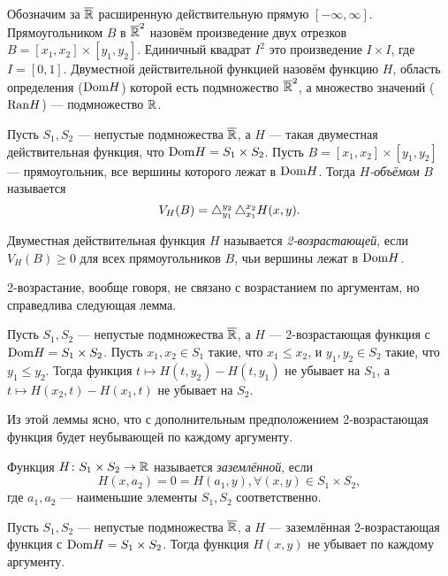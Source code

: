 Обозначим за $\overline{\mathbb{R}}$ расширенную действительную прямую $[-\infty, \infty]$. Прямоугольником $B$ в $\overline{\mathbb{R}}^2$ назовём произведение двух отрезков $B = [x_1, x_2] \times [y_1, y_2]$. Единичный квадрат $I^2$ это произведение $I \times I$, где $I = [0, 1]$. Двуместной действительной функцией назовём функцию $H$, область определения ($\mathrm{Dom}{H}$) которой есть подмножество $\overline{\mathbb{R}}^2$, а множество значений ($\mathrm{Ran}{H}$) --- подмножество $\mathbb{R}$.

\begin{define}
	Пусть $S_1, S_2$ --- непустые подмножества $\overline{\mathbb{R}}$, а $H$ --- такая двуместная действительная функция, что $\mathrm{Dom}{H} = S_1 \times S_2$. Пусть $B = [x_1, x_2] \times [y_1, y_2]$ --- прямоугольник, все вершины которого лежат в $\mathrm{Dom}{H}$. Тогда \emph{$H$-объёмом} $B$ называется
\[
V_H(B) = \mathop{}\!\mathbin\bigtriangleup_{y_1}^{y_2}\mathop{}\!\mathbin\bigtriangleup_{x_1}^{x_2}H(x, y).
\]
\end{define}

\begin{define}
	Двуместная действительная функция $H$ называется \emph{2-возрастающей}, если $V_H(B) \geqslant 0$ для всех прямоугольников $B$, чьи вершины лежат в $\mathrm{Dom}{H}$.
\end{define}

2-возрастание, вообще говоря, не связано с возрастанием по аргументам, но справедлива следующая лемма.

\begin{lemma}
	Пусть $S_1, S_2$ --- непустые подмножества $\overline{\mathbb{R}}$, а $H$ --- 2-возрастающая функция с $\mathrm{Dom}{H} = S_1 \times S_2$. Пусть $x_1, x_2 \in S_1$ такие, что $x_1 \leqslant x_2$, и $y_1, y_2 \in S_2$ такие, что $y_1 \leqslant y_2$. Тогда функция $t \mapsto H(t, y_2) - H(t, y_1)$ не убывает на $S_1$, а $t \mapsto H(x_2, t) - H(x_1, t)$ не убывает на $S_2$.
\end{lemma}

Из этой леммы ясно, что с дополнительным предположением 2-возрастающая функция будет неубывающей по каждому аргументу.

\begin{define}
	Функция $H \colon S_1 \times S_2 \to \mathbb{R}$ называется \emph{заземлённой}, если
\[
H(x, a_2) = 0 = H(a_1, y), \forall (x, y) \in S_1 \times S_2,
\]
где $a_1, a_2$ --- наименьшие элементы $S_1, S_2$ соответственно.
\end{define}

\begin{lemma}
	Пусть $S_1, S_2$ --- непустые подмножества $\overline{\mathbb{R}}$, а $H$ --- заземлённая 2-возрастающая функция с $\mathrm{Dom}{H} = S_1 \times S_2$. Тогда функция $H(x, y)$ не убывает по каждому аргументу.
\end{lemma}

